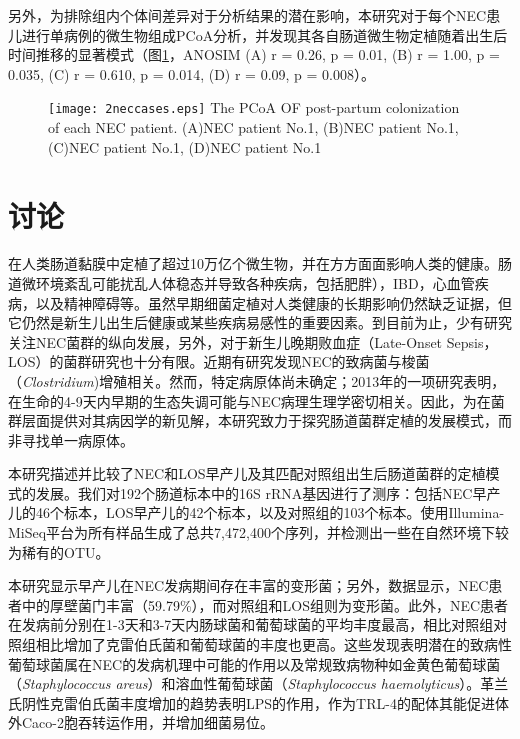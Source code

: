 {{      另外，为排除组内个体间差异对于分析结果的潜在影响，本研究对于每个NEC患儿进行单病例的微生物组成PCoA分析，并发现其各自肠道微生物定植随着出生后时间推移的显著模式（图\ref{fig:2neccases}，ANOSIM (A) r = 0.26, p = 0.01, (B) r = 1.00, p = 0.035, (C) r = 0.610, p = 0.014, (D) r = 0.09, p = 0.008）。
          \begin{figure}[!htp]
            \centering
            \texttt{[image: 2neccases.eps]}
              {The PCoA OF post-partum colonization of each NEC patient. (A)NEC patient No.1, (B)NEC patient No.1, (C)NEC patient No.1, (D)NEC patient No.1}
            \label{fig:2neccases}
          \end{figure}

\section{讨论}
在人类肠道黏膜中定植了超过10万亿个微生物\cite{Ley2006}，并在方方面面影响人类的健康\cite{Sekirov2009}。肠道微环境紊乱可能扰乱人体稳态并导致各种疾病，包括肥胖\cite{Liu2017}），IBD\cite{Ley2006}，心血管疾病\cite{Wang2011}，以及精神障碍\cite{Rogers2016}等。虽然早期细菌定植对人类健康的长期影响仍然缺乏证据，但它仍然是新生儿出生后健康或某些疾病易感性的重要因素。到目前为止，少有研究关注NEC菌群的纵向发展，另外，对于新生儿晚期败血症（Late-Onset Sepsis，LOS）的菌群研究也十分有限。近期有研究发现NEC的致病菌与梭菌（\textit{Clostridium})增殖相关\cite{hosny2017updating}。然而，特定病原体尚未确定；2013年的一项研究表明，在生命的4-9天内早期的生态失调可能与NEC病理生理学密切相关\cite{morrow2013early}。因此，为在菌群层面提供对其病因学的新见解，本研究致力于探究肠道菌群定植的发展模式，而非寻找单一病原体。

本研究描述并比较了NEC和LOS早产儿及其匹配对照组出生后肠道菌群的定植模式的发展。我们对192个肠道标本中的16S rRNA基因进行了测序：包括NEC早产儿的46个标本，LOS早产儿的42个标本，以及对照组的103个标本。使用Illumina-MiSeq平台为所有样品生成了总共7,472,400个序列，并检测出一些在自然环境下较为稀有的OTU。

本研究显示早产儿在NEC发病期间存在丰富的变形菌；另外，数据显示，NEC患者中的厚壁菌门丰富（59.79\%），而对照组和LOS组则为变形菌。此外，NEC患者在发病前分别在1-3天和3-7天内肠球菌和葡萄球菌的平均丰度最高，相比对照组对照组相比增加了克雷伯氏菌和葡萄球菌的丰度也更高。这些发现表明潜在的致​​病性葡萄球菌属在NEC的发病机理中可能的作用以及常规致病物种如金黄色葡萄球菌（\textit{Staphylococcus areus}）和溶血性葡萄球菌（\textit{Staphylococcus haemolyticus}）。革兰氏阴性克雷伯氏菌丰度增加的趋势表明LPS的作用，作为TRL-4的配体其能促进体外Caco-2胞吞转运作用\cite{panigrahi1996escherichia}，并增加细菌易位\cite{Deitch1987}。

}}
